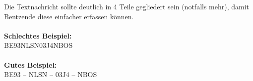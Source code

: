 
Die Textnachricht sollte deutlich in 4 Teile gegliedert sein (notfalls mehr), 
damit Bentzende diese einfacher erfassen können.\\\\
\textbf{Schlechtes Beispiel:}\\
BE93NLSN03J4NBOS
\\\\
\textbf{Gutes Beispiel:}\\
BE93 -- NLSN -- 03J4 -- NBOS